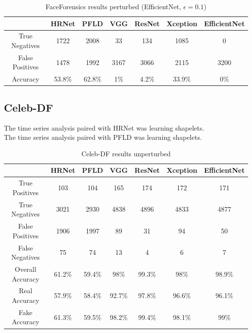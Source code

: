 \begin{table}[H]
    \centering
    \begin{tabular}{|c|c|c|c|c|c|c|}
        \hline
        \textbf{} & \textbf{HRNet} & \textbf{PFLD} &  \textbf{VGG} & \textbf{ResNet} & \textbf{Xception} & \textbf{EfficientNet} \\
        \hline
        True Negatives & 1722 & 2008 & 33 & 134 & 1085 & 0\\
        \hline
        False Positives & 1478 & 1992 & 3167 & 3066 & 2115 & 3200\\
        \hline
        Accuracy & 53.8\% & 62.8\% & 1\% & 4.2\% & 33.9\% & 0\% \\
        \hline
    \end{tabular}
    \caption{FaceForensics results perturbed (EfficientNet, $\epsilon=0.1$)}
    \label{tab:ff-eff-1}
\end{table}

\subsection{Celeb-DF}

The time series analysis paired with HRNet was learning shapelets.\\
The time series analysis paired with PFLD was learning shapelets.

\begin{table}[H]
    \centering
    \begin{tabular}{|c|c|c|c|c|c|c|}
        \hline
        \textbf{} & \textbf{HRNet} & \textbf{PFLD} &  \textbf{VGG} & \textbf{ResNet} & \textbf{Xception} & \textbf{EfficientNet} \\
        \hline
        True Positives & 103 & 104 & 165 & 174 & 172 & 171\\
        \hline
        True Negatives & 3021 & 2930 & 4838 & 4896 & 4833 & 4877\\
        \hline
        False Positives & 1906 & 1997 & 89 & 31 & 94 & 50\\
        \hline
        False Negatives & 75 & 74 & 13 & 4 & 6 & 7\\
        \hline
        Overall Accuracy & 61.2\% & 59.4\% & 98\% & 99.3\% & 98\% & 98.9\% \\
        \hline
        Real Accuracy & 57.9\% & 58.4\% & 92.7\% & 97.8\% & 96.6\% & 96.1\% \\
        \hline
        Fake Accuracy & 61.3\% & 59.5\% & 98.2\% & 99.4\% & 98.1\% & 99\% \\
        \hline
    \end{tabular}
    \caption{Celeb-DF results unperturbed}
    \label{tab:cd-un}
\end{table}

